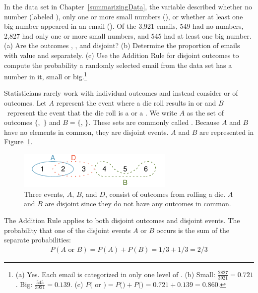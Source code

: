\begin{exercise}
In the  data set in Chapter~\ref{summarizingData}, the  variable described whether no number (labeled ), only one or more small numbers (), or whether at least one big number appeared in an email (). Of the 3,921 emails, 549 had no numbers, 2,827 had only one or more small numbers, and 545 had at least one big number. (a) Are the outcomes , , and  disjoint? (b) Determine the proportion of emails with value  and  separately. (c) Use the Addition Rule for disjoint outcomes to compute the probability a randomly selected email from the data set has a number in it, small or big.\footnote{(a) Yes. Each email is categorized in only one level of . (b) Small: $\frac{2827}{3921} = 0.721$. Big: $\frac{545}{3921} = 0.139$. (c) $P($ or $) = P($$) + P($$) = 0.721 + 0.139 = 0.860$.}
\end{exercise}


Statisticians rarely work with individual outcomes and instead consider  or  of outcomes. Let $A$ represent the event where a die roll results in  or  and $B$~represent the event that the die roll is a  or a . We write $A$ as the set of outcomes $\{$,~$\}$ and $B=\{$, $\}$. These sets are commonly called . Because $A$ and $B$ have no elements in common, they are disjoint events. $A$ and $B$ are represented in Figure~\ref{disjointSets}.

\begin{figure}[hhh]
\centering
\includegraphics[height=0.7in]{ch_probability/figures/disjointSets/disjointSets}
\caption{Three events, $A$, $B$, and $D$, consist of outcomes from rolling a die. $A$ and $B$ are disjoint since they do not have any outcomes in common.}
\label{disjointSets}
\end{figure}

The Addition Rule applies to both disjoint outcomes and disjoint events. The probability that one of the disjoint events $A$ or $B$ occurs is the sum of the separate probabilities:
\begin{eqnarray*}
P(A\text{ or }B) = P(A) + P(B) = 1/3 + 1/3 = 2/3
\end{eqnarray*}

